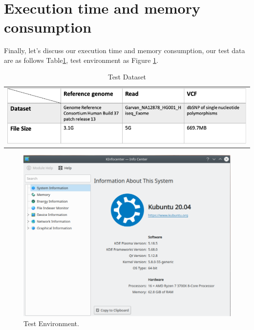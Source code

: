 \section{Execution time and memory consumption}

Finally, let’s discuss our execution time and memory consumption, our test data are as follows Table\ref{t4-8}, test environment as Figure \ref{f4-27}.

\vspace{1cm}
\begin{table}[h]
    \centering
    \caption[Test Dataset]{Test Dataset}
    \vspace{-0.5cm}
    \begin{tabular}{c}
        \includegraphics[width=1\textwidth]{body/image/t4-8.png}
    \end{tabular}
    \label{t4-8}
\end{table}

\begin{figure}[H]
    \centering
    \includegraphics[width=0.8\columnwidth]{body/image/4-27.png}
    \captionsetup{labelfont=bf}
    \renewcommand{\baselinestretch}{1.0}
    \caption[Test Environment]{Test Environment.}
    \label{f4-27}
\end{figure}

